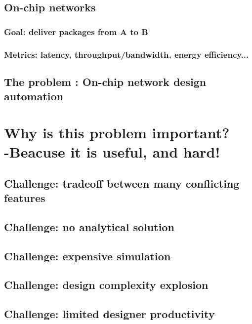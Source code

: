 \documentclass[12pt]{article}
\theoremstyle{definition}
\begin{document}
\subsection{On-chip networks}
\subsubsection{Goal: deliver packages from A to B}
\subsubsection{Metrics: latency, throughput/bandwidth, energy efficiency...}
\begin{figure}[h]
  \centering
  \begin{subfigure}
    {\texttt{[image: mesh]}}
  \end{subfigure}
\end{figure}
\pagebreak

\subsection{The problem : On-chip network design automation}
\pagebreak

\section{Why is this problem important? \\ -Beacuse it is useful, and hard!}
\subsection{Challenge: tradeoff between many conflicting features}
\subsection{Challenge: no analytical solution}
\subsection{Challenge: expensive simulation}
\subsection{Challenge: design complexity explosion}
\subsection{Challenge: limited designer productivity}
\pagebreak
\end{document}
